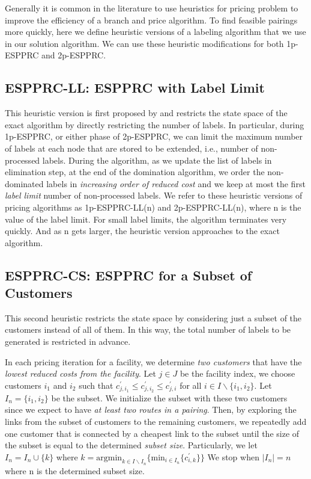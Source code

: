 Generally it is common in the literature to use heuristics for pricing problem to improve 
the efficiency of a branch and price algorithm. To find feasible pairings more quickly, 
here we define  heuristic versions of a labeling algorithm that we use in our 
solution algorithm. We can use these heuristic modifications for both 1p-ESPPRC
and 2p-ESPPRC.  

\subsection{ESPPRC-LL: ESPPRC with Label Limit}
This heuristic version is first proposed by \citet{Dumitrescu}
and restricts the state space of the exact algorithm by directly restricting the number 
of labels. In particular, during 1p-ESPPRC, or either phase of 2p-ESPPRC, we can limit 
the maximum number of labels at each node that are stored to be extended, i.e., number 
of  non-processed labels. During the algorithm, as we update the list of labels in 
elimination step, at the end of the domination algorithm, we order the non-dominated labels 
in {\em increasing order of reduced cost} and we keep at most the first {\em label limit} 
number of non-processed  labels. We refer to these heuristic versions of pricing algorithms 
as 1p-ESPPRC-LL(n) and 2p-ESPPRC-LL(n), where n is the value of the label limit. For small 
label limits, the algorithm terminates very quickly. And as n gets larger, the
heuristic version approaches to the exact algorithm. 

\subsection{ESPPRC-CS: ESPPRC for a Subset of Customers}
This second heuristic restricts the state space by considering just a 
subset of the customers instead of all of them. In this way, the total number of labels 
to be generated is restricted in advance. 

In each pricing iteration for a facility, we determine {\em two customers} that have 
the {\em lowest reduced costs from the facility}. Let $j \in J$ be the facility index,
we choose customers $i_1$ and $i_2$ such that 
$c^{'}_{j,i_1} \leq c^{'}_{j,i_2} \leq c^{'}_{j,i}$ for all  $i \in I \backslash \{i_1,i_2\}$. 
Let $I_n = \{i_1, i_2\}$ be the subset. We initialize the subset with these two
customers since we expect to have {\em at least two routes in a pairing}.  Then, by 
exploring the links from the subset of customers to the remaining customers, we 
repeatedly add one customer that is connected by a cheapest link to the subset until 
the size of the subset is equal to the determined {\em subset size}.
Particularly, we let $I_n = I_n \cup \{k\}$ where 
$k = \mbox{argmin}_{k \in I \backslash I_n}\{\mbox{min}_{i \in I_n}\{c^{'}_{i,k}\}\}$ 
We stop when $|I_n| = n$ where n is the determined subset size. 

